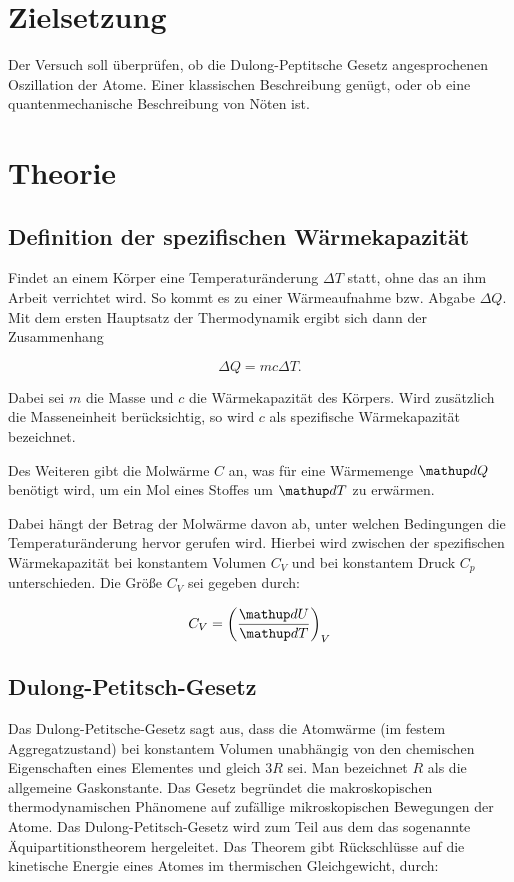 \section*{Zielsetzung}
Der Versuch soll überprüfen, ob die Dulong-Peptitsche Gesetz
angesprochenen Oszillation der Atome. Einer klassischen Beschreibung genügt,
oder ob eine quantenmechanische Beschreibung von Nöten ist.


\section{Theorie}

\subsection{Definition der spezifischen Wärmekapazität}

Findet an einem Körper eine Temperaturänderung $\Delta T$ statt, ohne das an ihm 
Arbeit verrichtet wird. So kommt es zu einer Wärmeaufnahme bzw. Abgabe $\Delta Q$.
Mit dem ersten Hauptsatz der Thermodynamik ergibt sich dann der Zusammenhang

\begin{equation*}
\Delta Q=m c \Delta T.
\end{equation*}

Dabei sei $m$ die Masse und $c$ die Wärmekapazität 
des Körpers.
Wird zusätzlich die Masseneinheit berücksichtig,
so wird $c$ als spezifische Wärmekapazität bezeichnet.

Des Weiteren gibt die Molwärme $C$
an, was für eine Wärmemenge $\map{d}Q$ benötigt wird,
um ein Mol eines Stoffes um $\map{d}T$ zu erwärmen.

Dabei hängt der Betrag der Molwärme davon ab, unter welchen Bedingungen 
die Temperaturänderung hervor gerufen wird.
Hierbei wird zwischen der spezifischen Wärmekapazität bei konstantem
Volumen $C_{V}$ und bei konstantem Druck $C_{p}$ unterschieden.
Die Größe $C_{V}$ sei gegeben durch:

\begin{equation}
\label{eq:molwarme}
C_V=\left(\frac{\map{d}U}{\map{d}T}\right)_V
\end{equation}


\subsection{Dulong-Petitsch-Gesetz}

Das Dulong-Petitsche-Gesetz sagt aus, dass die Atomwärme (im festem Aggregatzustand) bei 
konstantem Volumen unabhängig von den chemischen Eigenschaften eines Elementes 
und gleich $3R$ sei.
Man bezeichnet $R$ als die allgemeine Gaskonstante.
Das Gesetz begründet die makroskopischen thermodynamischen Phänomene 
auf zufällige mikroskopischen Bewegungen der Atome.
Das Dulong-Petitsch-Gesetz wird zum Teil aus dem 
das sogenannte Äquipartitionstheorem hergeleitet. 
Das Theorem gibt Rückschlüsse auf die kinetische Energie eines Atomes
im thermischen Gleichgewicht, durch:

